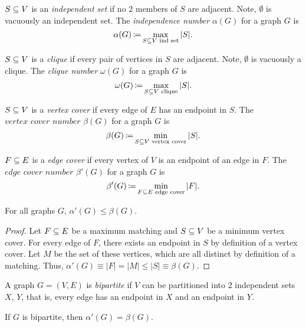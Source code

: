 \begin{defn}
    \label{def:independent-set}
    $S \subseteq V$ is an \textit{independent set} if no 2 members of $S$ are adjacent. Note, $\emptyset$ is vacuously an independent set. The \textit{independence number} $\alpha(G)$ for a graph $G$ is
    \[
        \alpha(G) \operatorname*{\coloneqq} \max_{S \subseteq V \text{ ind set}} |S|.
    \]
\end{defn}

\begin{defn}[Clique]
    \label{def:clique}
    $S \subseteq V$ is a \textit{clique} if every pair of vertices in $S$ are adjacent. Note, $\emptyset$ is vacuously a clique. The \textit{clique number} $\omega(G)$ for a graph $G$ is
    \[
        \omega(G) \operatorname*{\coloneqq} \max_{S \subseteq V \text{ clique}} |S|.
    \]
\end{defn}

\begin{defn}
    \label{def:vertex-cover}
    $S \subseteq V$ is a \textit{vertex cover} if every edge of $E$ has an endpoint in $S$. The $\textit{vertex cover number}$ $\beta(G)$ for a graph $G$ is
    \[
        \beta(G) \operatorname*{\coloneqq} \min_{S \subseteq V \text{ vertex cover}} |S|.
    \]
\end{defn}

\begin{defn}
    \label{def:edge-cover}
    $F \subseteq E$ is a \textit{edge cover} if every vertex of $V$ is an endpoint of an edge in $F$. The $\textit{edge cover number}$ $\beta'(G)$ for a graph $G$ is
    \[
        \beta'(G) \operatorname*{\coloneqq} \min_{F \subseteq E \text{ edge cover}} |F|.
    \]
\end{defn}

\begin{thm}
    \label{thm:weak-duality-matchings-vertex-covers}
    For all graphs $G$, $\alpha'(G) \le \beta(G)$.
    
    \begin{proof}
        Let $F \subseteq E$ be a maximum matching and $S \subseteq V$ be a minimum vertex cover. For every edge of $F$, there exists an endpoint in $S$ by definition of a vertex cover. Let $M$ be the set of these vertices, which are all distinct by definition of a matching. Thus, $\alpha'(G) \equiv |F| = |M| \le |S| \equiv \beta(G)$.
    \end{proof}
\end{thm}

\begin{defn}
    \label{def:bipartite-graph}
    A graph $G = (V, E)$ is \textit{bipartite} if $V$ can be partitioned into 2 independent sets $X$, $Y$, that is, every edge has an endpoint in $X$ and an endpoint in $Y$.
\end{defn}

\begin{thm}
    \label{thm:konig-egervary}
    If $G$ is bipartite, then $\alpha'(G) = \beta(G)$.
\end{thm}
